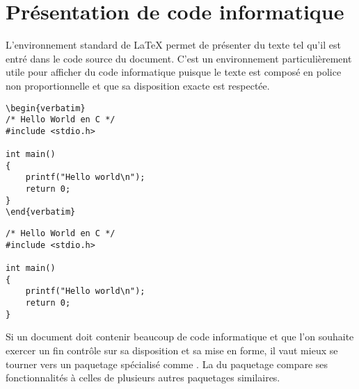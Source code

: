\section{Présentation de code informatique}
\label{sec:trucs:listings}

L'environnement standard  de {\LaTeX} permet de présenter
du texte tel qu'il est entré dans le code source du document. C'est un
environnement particulièrement utile pour afficher du code
informatique puisque le texte est composé en police non
proportionnelle et que sa disposition exacte est respectée.

\begin{demo}
  \begin{texample}
\begin{lstlisting}[deletetexcs={int,include}]
\begin{verbatim}
/* Hello World en C */
#include <stdio.h>

int main()
{
    printf("Hello world\n");
    return 0;
}
\end{verbatim}
\end{lstlisting}
    \producing
\begin{verbatim}
/* Hello World en C */
#include <stdio.h>

int main()
{
    printf("Hello world\n");
    return 0;
}
\end{verbatim}
  \end{texample}
\end{demo}

Si un document doit contenir beaucoup de code informatique et que l'on
souhaite exercer un fin contrôle sur sa disposition et sa mise en
forme, il vaut mieux se tourner vers un paquetage spécialisé comme
 \citep{listings}. La %
du paquetage compare ses fonctionnalités à celles de plusieurs autres
paquetages similaires.

